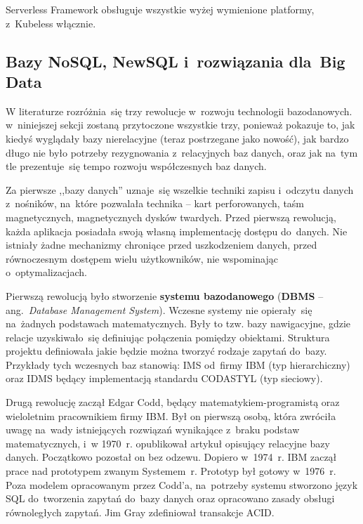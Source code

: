 \documentclass[12pt,a4paper,twoside,titlepage,openright]{book}
\begin{document}
Serverless Framework obsługuje wszystkie wyżej wymienione platformy, z~Kubeless włącznie.\cite{siteServerlessFramework}


\subsection{Bazy NoSQL, NewSQL i~rozwiązania dla~Big Data} \label{section:nosql}

W literaturze rozróżnia~się trzy rewolucje w~rozwoju technologii bazodanowych.  \cite{noSqlHistory} w~niniejszej sekcji zostaną przytoczone wszystkie trzy, ponieważ pokazuje to, jak kiedyś wyglądały bazy nierelacyjne (teraz postrzegane jako nowość), jak bardzo długo nie było potrzeby rezygnowania z~relacyjnych baz danych, oraz jak na~tym tle prezentuje~się tempo rozwoju współczesnych baz danych.

Za pierwsze ,,bazy danych'' uznaje~się wszelkie techniki zapisu i~odczytu danych z~nośników, na~które pozwalała technika -- kart perforowanych, taśm magnetycznych, magnetycznych dysków twardych. Przed pierwszą rewolucją, każda aplikacja posiadała swoją własną implementację dostępu do~danych. Nie istniały żadne mechanizmy chroniące przed uszkodzeniem danych, przed równoczesnym dostępem wielu użytkowników, nie wspominając o~optymalizacjach. 

Pierwszą rewolucją było stworzenie \textbf{systemu bazodanowego} (\textbf{DBMS} -- ang.~\textit{Database Management System}). Wczesne systemy nie opierały~się na~żadnych podstawach matematycznych. Były to tzw. bazy nawigacyjne, gdzie relacje uzyskiwało~się definiując połączenia pomiędzy obiektami. Struktura projektu definiowała jakie będzie można tworzyć rodzaje zapytań do~bazy. Przykłady tych wczesnych baz stanowią: IMS od~firmy IBM (typ hierarchiczny) oraz IDMS będący implementacją standardu CODASTYL (typ sieciowy). 

Drugą rewolucję zaczął Edgar Codd, będący matematykiem-programistą oraz wieloletnim pracownikiem firmy IBM. Był on pierwszą osobą, która zwróciła uwagę na~wady istniejących rozwiązań wynikające z~braku podstaw matematycznych, i~w 1970~r. opublikował artykuł opisujący relacyjne bazy danych. Początkowo pozostał on bez odzewu. Dopiero w~1974~r. IBM zaczął prace nad prototypem zwanym Systemem~r. Prototyp był gotowy w~1976~r. Poza modelem opracowanym przez Codd'a, na~potrzeby systemu stworzono język SQL do~tworzenia zapytań do~bazy danych oraz opracowano zasady obsługi równoległych zapytań. Jim Gray zdefiniował transakcje ACID.
\end{document}

